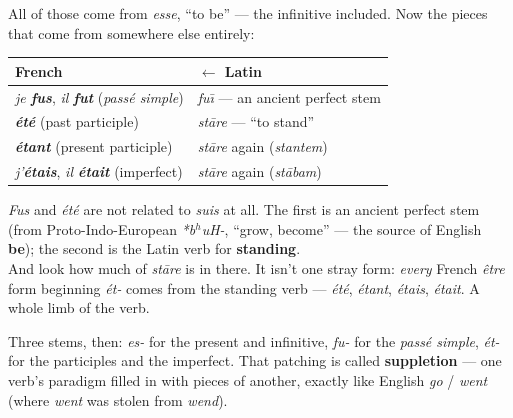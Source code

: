 All of those come from \emph{esse}, ``to be'' --- the infinitive included. Now
the pieces that come from somewhere else entirely:

\begin{center}
\begin{tabular}{@{}ll@{}}
\toprule
French & $\leftarrow$ Latin \\
\midrule
\emph{je \textbf{fus}}, \emph{il \textbf{fut}} (\emph{pass\'{e} simple}) & \emph{fu\={\i}} --- an ancient perfect stem \\
\emph{\textbf{\'{e}t\'{e}}} (past participle) & \emph{st\=are} --- ``to stand'' \\
\emph{\textbf{\'{e}tant}} (present participle) & \emph{st\=are} again (\emph{stantem}) \\
\emph{j'\textbf{\'{e}tais}}, \emph{il \textbf{\'{e}tait}} (imperfect) & \emph{st\=are} again (\emph{st\=abam}) \\
\bottomrule
\end{tabular}
\end{center}

\begin{cousinweb}
\emph{Fus} and \emph{\'{e}t\'{e}} are not related to \emph{suis} at all. The
first is an ancient perfect stem (from Proto-Indo-European \emph{*b$^h$uH-},
``grow, become'' --- the source of English \textbf{be}); the second is the Latin
verb for \textbf{standing}.\\[3pt]
And look how much of \emph{st\=are} is in there. It isn't one stray form:
\emph{every} French \emph{\^{e}tre} form beginning \emph{\'{e}t-} comes from the
standing verb --- \emph{\'{e}t\'{e}}, \emph{\'{e}tant}, \emph{\'{e}tais},
\emph{\'{e}tait}. A whole limb of the verb.
\end{cousinweb}

\begin{grammarlens}
Three stems, then: \emph{es-} for the present and infinitive, \emph{fu-} for the
\emph{pass\'{e} simple}, \emph{\'{e}t-} for the participles and the imperfect.
That patching is called \textbf{suppletion} --- one verb's paradigm filled in
with pieces of another, exactly like English \emph{go} / \emph{went} (where
\emph{went} was stolen from \emph{wend}).
\end{grammarlens}

